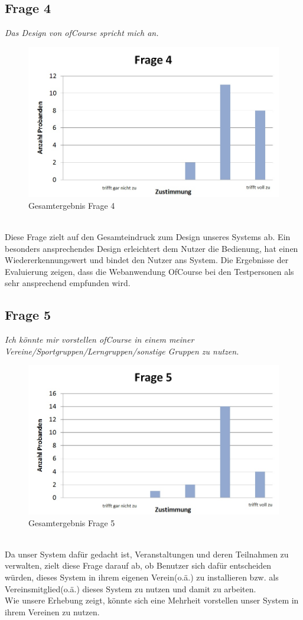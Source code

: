 \subsection{Frage 4}
\begin{center}
	{\it Das Design von ofCourse spricht mich an.}
\end{center}
\begin{figure}[h]
\centering
\includegraphics[width=0.7\linewidth]{img/Frage4}
\caption{Gesamtergebnis Frage 4}
\label{fig:Frage4}
\end{figure}\ \\

Diese Frage zielt auf den Gesamteindruck zum Design unseres Systems ab. Ein besonders ansprechendes Design erleichtert dem Nutzer die Bedienung, hat einen Wiedererkennungswert und bindet den Nutzer ans System. Die Ergebnisse der Evaluierung zeigen, dass die Webanwendung OfCourse bei den Testpersonen als sehr ansprechend empfunden wird.
\newpage
\subsection{Frage 5}
\begin{center}
	{\it Ich könnte mir vorstellen ofCourse in einem meiner Vereine/Sportgruppen/Lerngruppen/sonstige Gruppen zu nutzen.}
\end{center}
\begin{figure}[h]
\centering
\includegraphics[width=0.7\linewidth]{img/Frage5}
\caption{Gesamtergebnis Frage 5}
\label{fig:Frage5}
\end{figure}
\ \\
Da unser System dafür gedacht ist, Veranstaltungen und deren Teilnahmen zu verwalten, zielt diese Frage darauf ab, ob Benutzer sich dafür entscheiden würden, dieses System in ihrem eigenen Verein(o.ä.) zu installieren bzw. als Vereinsmitglied(o.ä.) dieses System zu nutzen und damit zu arbeiten.\\
Wie unsere Erhebung zeigt, könnte sich eine Mehrheit vorstellen unser System in ihrem Vereinen zu nutzen.
\ \\
